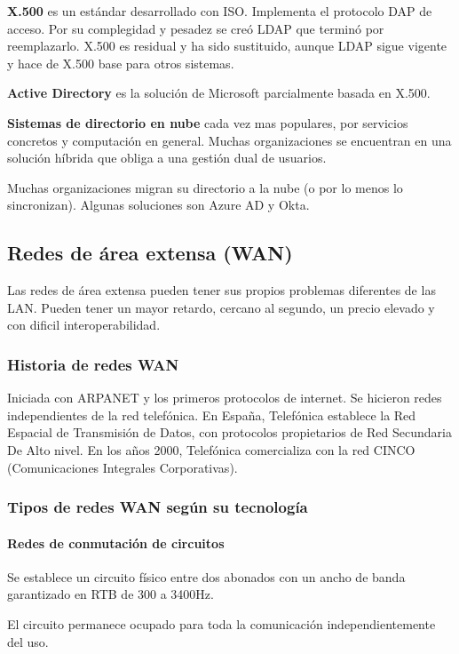                 \textbf{X.500} es un estándar desarrollado con ISO. Implementa el protocolo DAP de acceso. Por su complegidad y pesadez se creó LDAP que terminó por reemplazarlo. X.500 es residual y ha sido sustituido, aunque LDAP sigue vigente y hace de X.500 base para otros sistemas.

                \textbf{Active Directory} es la solución de Microsoft parcialmente basada en X.500.

                \textbf{Sistemas de directorio en nube} cada vez mas populares, por servicios concretos y computación en general. Muchas organizaciones se encuentran en una solución híbrida que obliga a una gestión dual de usuarios.

                Muchas organizaciones migran su directorio a la nube (o por lo menos lo sincronizan). Algunas soluciones son Azure AD y Okta.

\subsection{Redes de área extensa (WAN)} %
    Las redes de área extensa pueden tener sus propios problemas diferentes de las LAN. Pueden tener un mayor retardo, cercano al segundo, un precio elevado y con dificil interoperabilidad.

    \subsubsection{Historia de redes WAN} %
        Iniciada con ARPANET y los primeros protocolos de internet. Se hicieron redes independientes de la red telefónica. En España, Telefónica establece la Red Espacial de Transmisión de Datos, con protocolos propietarios de Red Secundaria De Alto nivel. En los años 2000, Telefónica comercializa con la red CINCO (Comunicaciones Integrales Corporativas).

    \subsubsection{Tipos de redes WAN según su tecnología} %
        \paragraph{Redes de conmutación de circuitos} %
            Se establece un circuito físico entre dos abonados con un ancho de banda garantizado en RTB de 300 a 3400Hz.

            El circuito permanece ocupado para toda la comunicación independientemente del uso. 

